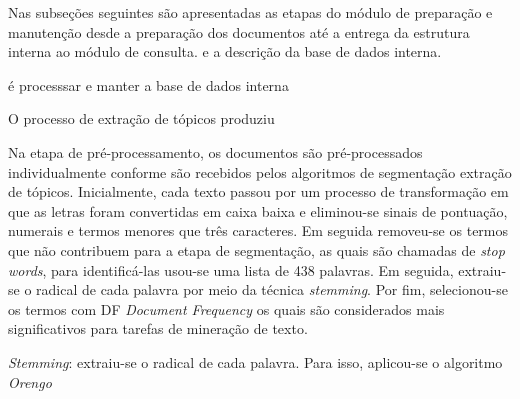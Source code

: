 Nas subseções seguintes são apresentadas as etapas do módulo de preparação e manutenção desde a preparação dos documentos até a entrega da estrutura interna ao módulo de consulta. 
e a descrição da base de dados interna.
















 é processsar e manter a base de dados interna











O processo de extração de tópicos produziu 












Na etapa de pré-processamento, os documentos são pré-processados individualmente conforme são recebidos pelos algoritmos de segmentação extração de tópicos. 
Inicialmente, cada texto passou por um processo de transformação em que as letras foram convertidas em caixa baixa e eliminou-se sinais de pontuação, numerais e termos menores que três caracteres. Em seguida removeu-se os termos que não contribuem para a etapa de segmentação, as quais são chamadas de \textit{stop words}, para identificá-las usou-se uma lista de 438 palavras. Em seguida, extraiu-se o radical de cada palavra por meio da técnica \textit{stemming}. Por fim, selecionou-se os termos com DF \textit{Document Frequency}  os quais são considerados mais significativos para tarefas de mineração de texto.



\textit{Stemming}: extraiu-se o radical de cada palavra. Para isso, aplicou-se o algoritmo \textit{Orengo} %













